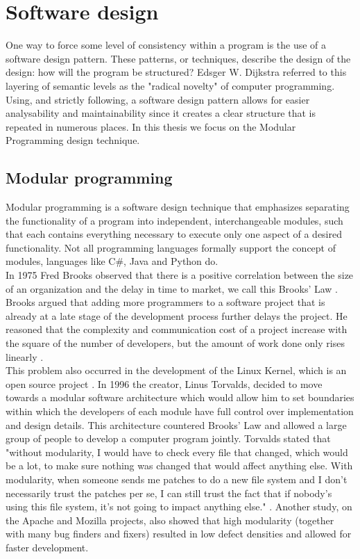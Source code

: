 \documentclass[twoside]{uva-inf-bachelor-thesis}
\begin{document}
\section{Software design}
One way to force some level of consistency within a program is the use of a software design pattern. These patterns, or techniques, describe the design of the design: how will the program be structured? Edsger W. Dijkstra referred to this layering of semantic levels as the "radical novelty" of computer programming\cite{dijkstra1988}. Using, and strictly following, a software design pattern allows for easier analysability and maintainability since it creates a clear structure that is repeated in numerous places. In this thesis we focus on the Modular Programming design technique.

\subsection{Modular programming}
Modular programming is a software design technique that emphasizes separating the functionality of a program into independent, interchangeable modules, such that each contains everything necessary to execute only one aspect of a desired functionality. Not all programming languages formally support the concept of modules, languages like C\#\cite{csharpmodules}, Java\cite{javamodules} and Python\cite{pythonmodules} do.\\

In 1975 Fred Brooks observed that there is a positive correlation between the size of an organization and the delay in time to market, we call this Brooks' Law \cite{brooks1975mythical}. Brooks argued that adding more programmers to a software project that is already at a late stage of the development process further delays the project. He reasoned that the complexity and communication cost of a project increase with the square of the number of developers, but the amount of work done only rises linearly \cite{lee2000linux}.\\

This problem also occurred in the development of the Linux Kernel, which is an open source project \cite{LinuxKernel}. In 1996 the creator, Linus Torvalds, decided to move towards a modular software architecture which would allow him to set boundaries within which the developers of each module have full control over implementation and design details. This architecture countered Brooks' Law and allowed a large group of people to develop a computer program jointly. Torvalds stated that "without modularity, I would have to check every file that changed, which would be a lot, to make sure nothing was changed that would affect anything else. With modularity, when someone sends me patches to do a new file system and I don't necessarily trust the patches per se, I can still trust the fact that if nobody's using this file system, it's not going to impact anything else." \cite{lee2000linux}. Another study, on the Apache and Mozilla projects, also showed that high modularity (together with many bug finders and fixers) resulted in low defect densities and allowed for faster development.\\
\end{document}
